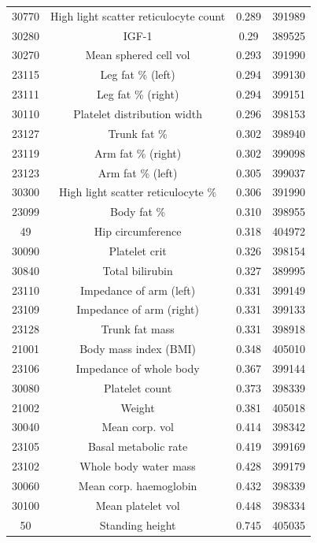 \begin{longtable}{|c|c|c|c|}
30770 &  High light scatter reticulocyte count & 0.289 & 391989 \\
30280 &  IGF-1 & 0.29 & 389525 \\
30270 &  Mean sphered cell vol & 0.293 & 391990 \\
23115 & Leg fat \% (left) & 0.294 & 399130\\
23111 & Leg fat \% (right) & 0.294 & 399151\\
30110 &  Platelet distribution width & 0.296 & 398153 \\
23127 & Trunk fat \% & 0.302 & 398940\\
23119 & Arm fat \% (right) & 0.302 & 399098\\
23123 & Arm fat \% (left) & 0.305 & 399037\\
30300 &  High light scatter reticulocyte \% & 0.306 & 391990 \\
23099 & Body fat \% & 0.310 & 398955\\
49 & Hip circumference & 0.318 & 404972\\
30090 &  Platelet crit & 0.326 & 398154 \\
30840 &  Total bilirubin & 0.327 & 389995 \\
23110 & Impedance of arm (left) & 0.331 & 399149\\
23109 & Impedance of arm (right) & 0.331 & 399133 \\
23128 & Trunk fat mass & 0.331 & 398918 \\
21001 & Body mass index (BMI) & 0.348 & 405010\\
23106 & Impedance of whole body & 0.367 & 399144 \\
30080 &  Platelet count & 0.373 & 398339   \\
21002 & Weight & 0.381 & 405018 \\
30040 &  Mean corp. vol & 0.414 & 398342  \\
23105 & Basal metabolic rate & 0.419 & 399169\\
23102 & Whole body water mass & 0.428 & 399179 \\
30060 &  Mean corp. haemoglobin & 0.432 & 398339 \\
30100 &  Mean platelet vol & 0.448 & 398334 \\
50 & Standing height & 0.745 & 405035 \\
\end{longtable}

